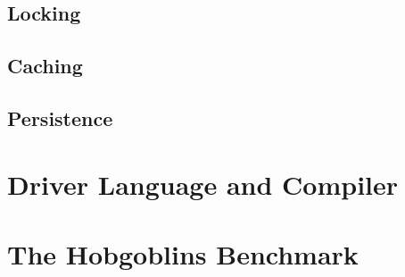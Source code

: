 \documentclass[12pt,a4paper]{article}
\let\oldsection\section
\renewcommand\section{\clearpage\oldsection}
\begin{document}
\subsection{Locking}\label{sec:locking}

\subsection{Caching}\label{sec:caching}

\subsection{Persistence}\label{sec:persistence}

\section{Driver Language and Compiler}\label{sec:compiler}

\section{The Hobgoblins Benchmark}\label{sec:hobgoblins}

\end{document}
